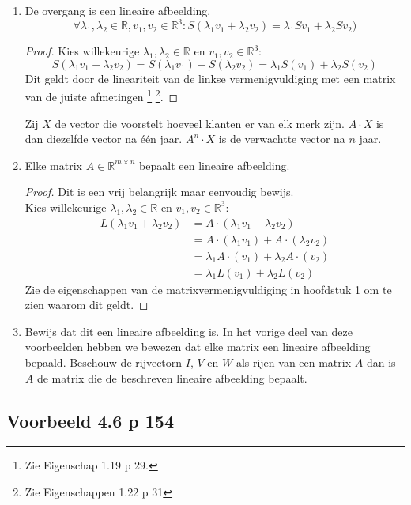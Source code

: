 \documentclass[lineaire_algebra_oplossingen.tex]{subfiles}
\begin{document}
\begin{enumerate}
\item De overgang is een lineaire afbeelding.
\[
\forall \lambda_1, \lambda_2 \in \mathbb{R}, v_1,v_2 \in \mathbb{R}^3: S(\lambda_1v_1+\lambda_2v_2) = \lambda_1 S v_1+\lambda_2Sv_2)
\]
\begin{proof}
Kies willekeurige $\lambda_1, \lambda_2 \in \mathbb{R}$ en $v_1,v_2 \in \mathbb{R}^3$:
\[
S(\lambda_1v_1+\lambda_2v_2)
= S(\lambda_1v_1)+S(\lambda_2v_2)
= \lambda_1 S (v_1)+\lambda_2S(v_2)
\]
Dit geldt door de lineariteit van de linkse vermenigvuldiging met een matrix van de juiste afmetingen \footnote{Zie Eigenschap 1.19 p 29.} \footnote{Zie Eigenschappen 1.22 p 31}.
\end{proof}
Zij $X$ de vector die voorstelt hoeveel klanten er van elk merk zijn.
$A\cdot X$ is dan diezelfde vector na \'e\'en jaar. $A^n\cdot X$ is de verwachtte vector na $n$ jaar.

\item Elke matrix $A \in \mathbb{R}^{m\times n}$ bepaalt een lineaire afbeelding.
\begin{proof}
Dit is een vrij belangrijk maar eenvoudig bewijs.\\
Kies willekeurige $\lambda_1, \lambda_2 \in \mathbb{R}$ en $v_1,v_2 \in \mathbb{R}^3$:
\begin{align*}
L(\lambda_1v_1+\lambda_2v_2)
&= A\cdot(\lambda_1v_1+\lambda_2v_2) \\
&= A\cdot(\lambda_1v_1)+A\cdot(\lambda_2v_2) \\
&= \lambda_1A\cdot(v_1)+\lambda_2A\cdot(v_2) \\
&= \lambda_1 L(v_1)+\lambda_2L(v_2)
\end{align*}
Zie de eigenschappen van de matrixvermenigvuldiging in hoofdstuk 1 om te zien waarom dit geldt.
\end{proof}

\item Bewijs dat dit een lineaire afbeelding is. In het vorige deel van deze voorbeelden hebben we bewezen dat elke matrix een lineaire afbeelding bepaald. Beschouw de rijvectorn $I$, $V$ en $W$ als rijen van een matrix $A$ dan is $A$ de matrix die de beschreven lineaire afbeelding bepaalt.


\end{enumerate}


\subsection{Voorbeeld 4.6 p 154}
\label{4.6}
\end{document}
